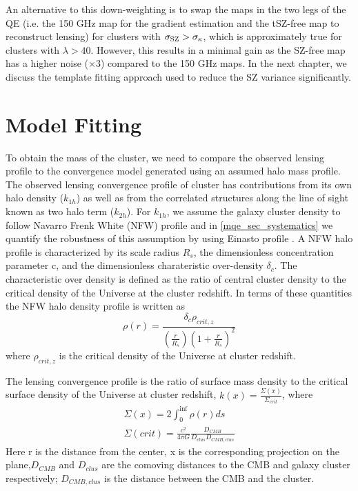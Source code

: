 An alternative to this down-weighting is to swap the maps in the two legs of the QE (i.e. the 150 GHz map for the gradient estimation and the tSZ-free map to reconstruct lensing) for clusters with \mbox{$\sigma_{\rm SZ} > \sigma_{\kappa}$}, which is approximately true for clusters with $\lambda > 40$. However, this results in a minimal gain as the \sptpol{} SZ-free map has a higher noise ($\times3$) compared to the \sptpol{} 150 GHz maps. 
In the next chapter, we discuss the template fitting approach used to reduce the SZ variance significantly.
 \section{Model Fitting}
 \label{sec:model_fitting}
To obtain the mass of the cluster, we need to compare the observed lensing profile to the convergence model generated using an assumed halo mass profile.
 The observed lensing convergence profile of cluster has contributions from its own halo density ($k_{1h}$) as well as from the correlated structures along the line of sight known as two halo term ($k_{2h}$).
 For $k_{1h}$, we assume the galaxy cluster density to follow Navarro Frenk White (NFW) profile and in \ref{mqe_sec_systematics} we quantify the robustness of this assumption by using Einasto profile \citep{Einasto}.
 A NFW halo profile is characterized by its scale radius $R_{s}$, the dimensionless concentration parameter c, and the dimensionless charateristic over-density $\delta_{c}$.
 The characteristic over density is defined as the ratio of central cluster density to the critical density of the Universe at the cluster redshift.
 In terms of these quantities the NFW halo density profile is written as 
 \begin{equation}
 \rho(r) = \frac{\delta_{c}\rho_{crit,z}}{(\frac{r}{R_{s}})(1 + \frac{r}{R_{s}})^{2}}
 \end{equation} 
 where $\rho_{crit,z}$ is the critical density of the Universe at cluster redshift.
 
 The lensing convergence profile is the ratio of surface mass density to the critical surface density of the Universe at cluster redshift, $k(x) = \frac{\Sigma(x)}{\Sigma_{crit}}$, where
 \begin{eqnarray}
 \Sigma(x) = 2 \int^{\inf}_{0} \rho(r) ds\\
 \Sigma(crit) = \frac{c^{2}}{4\pi G} \frac{D_{CMB}}{D_{clus} D_{CMB,clus}} 
 \end{eqnarray} 
Here r is the distance from the center, x is the corresponding projection on the plane,$D_{CMB}$ and $D_{clus}$ are the comoving distances to the CMB and galaxy cluster respectively; $D_{CMB,clus}$ is the distance between the CMB and the cluster.

